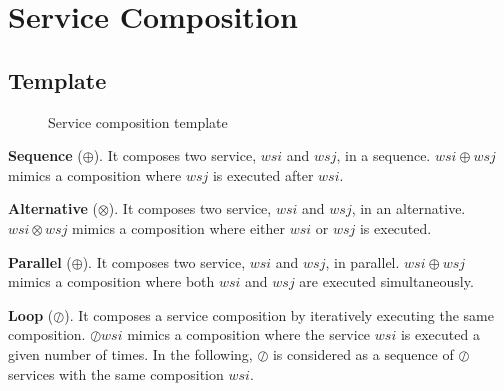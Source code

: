 \section{Service Composition}
\subsection{Template}
\begin{figure}[h!]
  \centering
  \caption{Service composition template}
  \label{fig:service_composition_template}
\end{figure}
\textbf{Sequence} ($\oplus$). It composes two service, $wsi$ and $wsj$, in a sequence. $wsi\oplus wsj$ mimics a composition where $wsj$ is executed after $wsi$.

\textbf{Alternative} ($\otimes$). It composes two service, $wsi$ and $wsj$, in an alternative. $wsi\otimes wsj$ mimics a composition where either $wsi$ or $wsj$ is executed.

\textbf{Parallel} ($\oplus$). It composes two service, $wsi$ and $wsj$, in parallel. $wsi\oplus wsj$ mimics a composition where both $wsi$ and $wsj$ are executed simultaneously.

\textbf{Loop} ($\oslash$). It composes a service composition by iteratively executing the same composition. $\oslash wsi$ mimics a composition where the service $wsi$ is executed a given number of times. In the following, $\oslash$ is considered as a sequence of $\oslash$ services with the same composition $wsi$.

